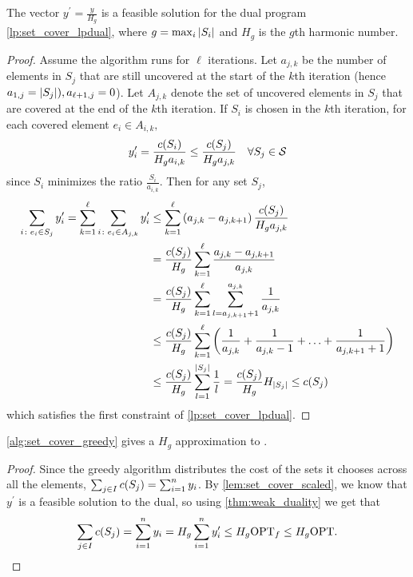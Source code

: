 \begin{lemma}
    The vector $y^\prime = \frac{y}{H_g}$ is a feasible solution for the dual program \cref{lp:set_cover_lpdual}, where $g = \max_i \abs{S_i}$ and 
    $H_g$ is the $g$th harmonic number. 
    \label{lem:set_cover_scaled}
\end{lemma}
\begin{proof}
    Assume the algorithm runs for $\ell$ iterations. Let $a_{j,k}$ be the number of elements in $S_j$ that are still uncovered
    at the start of the $k$th iteration (hence $a_{1, j} = \abs{S_j}), a_{\ell+1, j} = 0$). Let $A_{j,k}$ denote the set of uncovered
    elements in $S_j$ that are covered at the end of the $k$th iteration. If $S_i$ is chosen in the $k$th iteration, for each covered element
    $e_i \in A_{i,k},$
    \[
        y_i^\prime = \frac{\f[c]{S_i}}{H_g a_{i,k}} \leq \frac{\f[c]{S_j}}{H_g a_{j,k}} \quad \forall S_j \in \calS
    \]
    since $S_i$ minimizes the ratio $\frac{S_i}{a_{i,k}}$. Then for any set $S_j$, 
    \begin{align*}
        \sum_{i\colon e_i\in S_j} y_i^\prime = \sum_{k=1}^{\ell} \sum_{i\colon e_i \in A_{j,k}} y_i^\prime 
        &\leq \sum_{k=1}^{\ell} \lrp{a_{j,k} - a_{j,k+1}} \frac{\f[c]{S_j}}{H_g a_{j,k}}\\
        &= \frac{\f[c]{S_j}}{H_g} \sum_{k=1}^{\ell} \frac{a_{j,k} - a_{j, k+1}}{a_{j, k}}\\
        &= \frac{\f[c]{S_j}}{H_g} \sum_{k=1}^{\ell} \sum_{l=a_{j,k+1}+1}^{a_{j,k}} \frac{1}{a_{j,k}}\\
        &\leq \frac{\f[c]{S_j}}{H_g} \sum_{k=1}^{\ell} \lrp{\frac{1}{a_{j,k}} + \frac{1}{a_{j,k}-1} + \ldots + \frac{1}{a_{j,k+1}+1}} \\
        &\leq  \frac{\f[c]{S_j}}{H_g} \sum_{l=1}^{\abs{S_j}} \frac{1}{l} =  \frac{\f[c]{S_j}}{H_g} H_{\abs{S_j}} \leq \f[c]{S_j}
    \end{align*}
    which satisfies the first constraint of \cref{lp:set_cover_lpdual}. 
\end{proof}

\begin{theorem}
    \cref{alg:set_cover_greedy} gives a $H_g$ approximation to \setcover{}. 
    \label{thm:approx_set_cover_dual_fitting}
\end{theorem}
\begin{proof}
    Since the greedy algorithm distributes the cost of the sets it chooses across all the elements, 
    $\sum_{j \in I} \f[c]{S_j} = \sum_{i=1}^{n} y_i$. By \cref{lem:set_cover_scaled}, we know that $y^\prime$ is a feasible solution to the dual, 
    so using \cref{thm:weak_duality} we get that 
    \begin{equation*}   
        \sum_{j \in I} \f[c]{S_j} = \sum_{i=1}^{n} y_i = H_g \sum_{i=1}^{n} y_i^\prime \leq H_g \OPT_f \leq H_g \OPT. 
    \end{equation*}
\end{proof}


